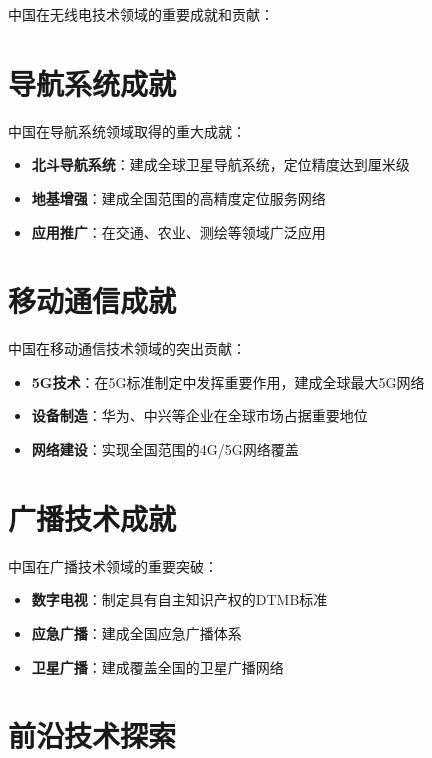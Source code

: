 \documentclass[12pt,UTF8]{ctexbook}
\begin{document}
中国在无线电技术领域的重要成就和贡献：

\section{导航系统成就}

中国在导航系统领域取得的重大成就：

\begin{itemize}[leftmargin=3.5em]
    \item \textbf{北斗导航系统}：建成全球卫星导航系统，定位精度达到厘米级
    \item \textbf{地基增强}：建成全国范围的高精度定位服务网络
    \item \textbf{应用推广}：在交通、农业、测绘等领域广泛应用
\end{itemize}

\section{移动通信成就}

中国在移动通信技术领域的突出贡献：

\begin{itemize}[leftmargin=3.5em]
    \item \textbf{5G技术}：在5G标准制定中发挥重要作用，建成全球最大5G网络
    \item \textbf{设备制造}：华为、中兴等企业在全球市场占据重要地位
    \item \textbf{网络建设}：实现全国范围的4G/5G网络覆盖
\end{itemize}

\section{广播技术成就}

中国在广播技术领域的重要突破：

\begin{itemize}[leftmargin=3.5em]
    \item \textbf{数字电视}：制定具有自主知识产权的DTMB标准
    \item \textbf{应急广播}：建成全国应急广播体系
    \item \textbf{卫星广播}：建成覆盖全国的卫星广播网络
\end{itemize}

\section{前沿技术探索}
\end{document}
